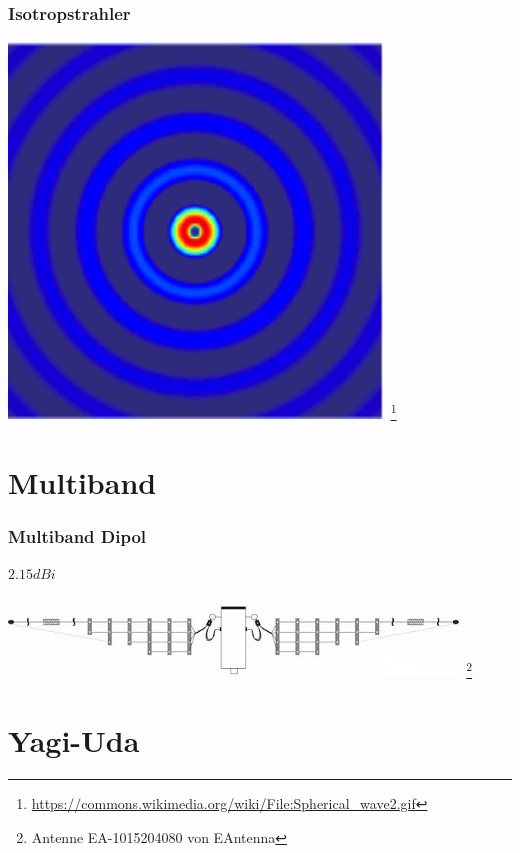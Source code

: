 \begin{frame}
    \frametitle{Isotropstrahler}
    \begin{center}
        \includegraphics[width=0.75\textwidth]{e11/Spherical_wave2.png}
        \footnote{\tiny \url{https://commons.wikimedia.org/wiki/File:Spherical_wave2.gif}}
	\end{center}
\end{frame}

\section*{Multiband}

\begin{frame}
    \frametitle{Multiband Dipol}
    $2.15dBi$
    \begin{center}
        \includegraphics[width=0.9\textwidth]{e11/Multiband.jpg}
        \footnote{\tiny Antenne EA-1015204080 von EAntenna}
	\end{center}
\end{frame}


\section*{Yagi-Uda}

